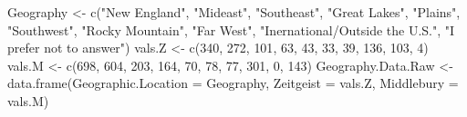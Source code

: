 \documentclass[
]{article}
\newenvironment{Shaded}{\begin{snugshade}}{\end{snugshade}}
\newcommand{\AttributeTok}[1]{\textcolor[rgb]{0.77,0.63,0.00}{#1}}
\newcommand{\DecValTok}[1]{\textcolor[rgb]{0.00,0.00,0.81}{#1}}
\newcommand{\FunctionTok}[1]{\textcolor[rgb]{0.00,0.00,0.00}{#1}}
\newcommand{\NormalTok}[1]{#1}
\newcommand{\OtherTok}[1]{\textcolor[rgb]{0.56,0.35,0.01}{#1}}
\newcommand{\StringTok}[1]{\textcolor[rgb]{0.31,0.60,0.02}{#1}}
\begin{document}
\begin{Shaded}
\begin{Highlighting}[]
\NormalTok{Geography }\OtherTok{\textless{}{-}} \FunctionTok{c}\NormalTok{(}\StringTok{"New England"}\NormalTok{, }\StringTok{"Mideast"}\NormalTok{, }\StringTok{"Southeast"}\NormalTok{, }\StringTok{"Great Lakes"}\NormalTok{, }\StringTok{"Plains"}\NormalTok{, }
               \StringTok{"Southwest"}\NormalTok{, }\StringTok{"Rocky Mountain"}\NormalTok{, }\StringTok{"Far West"}\NormalTok{, }
               \StringTok{"Inernational/Outside the U.S."}\NormalTok{, }\StringTok{"I prefer not to answer"}\NormalTok{)}
\NormalTok{vals.Z }\OtherTok{\textless{}{-}} \FunctionTok{c}\NormalTok{(}\DecValTok{340}\NormalTok{, }\DecValTok{272}\NormalTok{, }\DecValTok{101}\NormalTok{, }\DecValTok{63}\NormalTok{, }\DecValTok{43}\NormalTok{, }\DecValTok{33}\NormalTok{, }\DecValTok{39}\NormalTok{, }\DecValTok{136}\NormalTok{, }\DecValTok{103}\NormalTok{, }\DecValTok{4}\NormalTok{)}
\NormalTok{vals.M }\OtherTok{\textless{}{-}} \FunctionTok{c}\NormalTok{(}\DecValTok{698}\NormalTok{, }\DecValTok{604}\NormalTok{, }\DecValTok{203}\NormalTok{, }\DecValTok{164}\NormalTok{, }\DecValTok{70}\NormalTok{, }\DecValTok{78}\NormalTok{, }\DecValTok{77}\NormalTok{, }\DecValTok{301}\NormalTok{, }\DecValTok{0}\NormalTok{, }\DecValTok{143}\NormalTok{)}
\NormalTok{Geography.Data.Raw }\OtherTok{\textless{}{-}} \FunctionTok{data.frame}\NormalTok{(}\AttributeTok{Geographic.Location =}\NormalTok{ Geography,}
                             \AttributeTok{Zeitgeist =}\NormalTok{ vals.Z,}
                             \AttributeTok{Middlebury =}\NormalTok{ vals.M)}





\end{Highlighting}
\end{Shaded}
\end{document}
